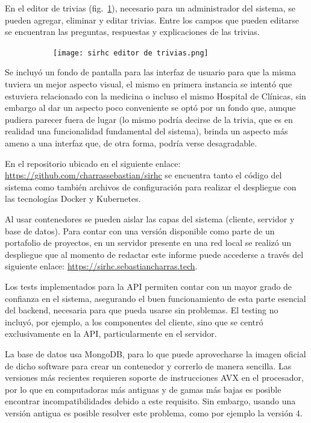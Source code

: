 \documentclass{article}
\begin{document}
\vspace{-1.0\baselineskip}
En el editor de trivias (fig.~\ref{fig:editorTrivias}), necesario para un administrador del sistema, se pueden agregar, eliminar y editar trivias. Entre los campos que pueden editarse se encuentran las preguntas, respuestas y explicaciones de las trivias.
\begin{figure}[H]
	\caption{Interfaz del editor de trivias}
    \begin{subfigure}{1\textwidth}
	\texttt{[image: sirhc editor de trivias.png]}
    \end{subfigure}
	\label{fig:editorTrivias}
\end{figure}
\vspace{-1.0\baselineskip}
Se incluyó un fondo de pantalla para las interfaz de usuario para que la misma tuviera un mejor aspecto visual, el mismo en primera instancia se intentó que estuviera relacionado con la medicina o incluso el mismo Hospital de Clínicas, sin embargo al dar un aspecto poco conveniente se optó por un fondo que, aunque pudiera parecer fuera de lugar (lo mismo podría decirse de la trivia, que es en realidad una funcionalidad fundamental del sistema), brinda un aspecto más ameno a una interfaz que, de otra forma, podría verse desagradable.

En el repositorio ubicado en el siguiente enlace: \href{https://github.com/charrassebastian/sirhc}{https://github.com/charrassebastian/sirhc} se encuentra tanto el código del sistema como también archivos de configuración para realizar el despliegue con las tecnologías Docker y Kubernetes.

Al usar contenedores se pueden aislar las capas del sistema (cliente, servidor y base de datos). Para contar con una versión disponible como parte de un portafolio de proyectos, en un servidor presente en una red local se realizó un despliegue que al momento de redactar este informe puede accederse a través del siguiente enlace: \href{https://sirhc.sebastiancharras.tech}{https://sirhc.sebastiancharras.tech}.

Los tests implementados para la API permiten contar con un mayor grado de confianza en el sistema, asegurando el buen funcionamiento de esta parte esencial del backend, necesaria para que pueda usarse sin problemas. El testing no incluyó, por ejemplo, a los componentes del cliente, sino que se centró exclusivamente en la API, particularmente en el servidor.

La base de datos usa MongoDB, para lo que puede aprovecharse la imagen oficial de dicho software para crear un contenedor y correrlo de manera sencilla. Las versiones más recientes requieren soporte de instrucciones AVX en el procesador, por lo que en computadoras más antiguas y de gamas más bajas es posible encontrar incompatibilidades debido a este requisito. Sin embargo, usando una versión antigua es posible resolver este problema, como por ejemplo la versión 4.
\newpage
\end{document}
